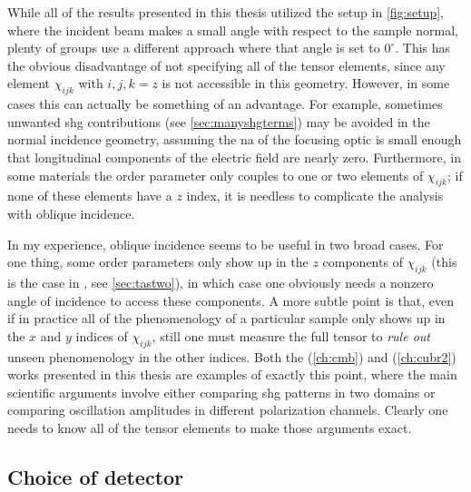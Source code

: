 While all of the results presented in this thesis utilized the setup in \cref{fig:setup}, where the incident beam makes a small angle with respect to the sample normal, plenty of groups use a different approach where that angle is set to $0^\circ$.
This has the obvious disadvantage of not specifying all of the tensor elements, since any element $\chi_{ijk}$ with $i, j, k = z$ is not accessible in this geometry.
However, in some cases this can actually be something of an advantage.
For example, sometimes unwanted \gls{shg} contributions (see \cref{sec:manyshgterms}) may be avoided in the normal incidence geometry, assuming the \gls{na} of the focusing optic is small enough that longitudinal components of the electric field are nearly zero.
Furthermore, in some materials the order parameter only couples to one or two elements of $\chi_{ijk}$; if none of these elements have a $z$ index, it is needless to complicate the analysis with oblique incidence.

In my experience, oblique incidence seems to be useful in two broad cases.
For one thing, some order parameters only show up in the $z$ components of $\chi_{ijk}$ (this is the case in \tastwo, see \cref{sec:tastwo}), in which case one obviously needs a nonzero angle of incidence to access these components.
A more subtle point is that, even if in practice all of the phenomenology of a particular sample only shows up in the $x$ and $y$ indices of $\chi_{ijk}$, still one must measure the full tensor to \emph{rule out} unseen phenomenology in the other indices.
Both the  (\cref{ch:cmb}) and  (\cref{ch:cubr2}) works presented in this thesis are examples of exactly this point, where the main scientific arguments involve either comparing \gls{shg} patterns in two domains or comparing oscillation amplitudes in different polarization channels.
Clearly one needs to know all of the tensor elements to make those arguments exact.

\subsection{Choice of detector}

